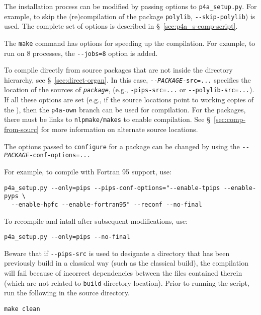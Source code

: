\documentclass[a4paper]{article}
\begin{document}
The installation process can be modified by passing options to
\verb|p4a_setup.py|. For example, to skip the (re)compilation of the
package \texttt{polylib},
\verb/--skip-polylib/) is used. The complete set of options is described in
\S~\ref{sec:p4a_s-comp-script}.

The \texttt{make} command has options for speeding up the compilation. For
example, to run on 8 processes, the \verb/--jobs=8/ option is added.

To compile \Apfa directly from source packages that are not
inside the \Apfa directory hierarchy, see \S~\ref{sec:direct-organ}. In
this case, \texttt{-{}-\emph{PACKAGE}-src=...} specifies the
location of the sources of \texttt{\emph{package}}, (e.g.,
\verb|-pips-src=...| or \verb|--polylib-src=...|). If all these options are
set (e.g., if the source locations point to working copies of the
\Apips{} \Asvn), then the \texttt{p4a-own} branch can be used for
compilation. For the \Apips
packages, there must be links to \texttt{nlpmake/makes} to enable compilation.
See \S~\ref{sec:comp-from-sourc} for more information on alternate
source locations.

The options passed to \texttt{configure} for a package can be changed by
using the \texttt{-{}-\emph{PACKAGE}-conf-options=...}

For example, to compile \Apips with Fortran 95 support, use:
\begin{verbatim}
p4a_setup.py --only=pips --pips-conf-options="--enable-tpips --enable-pyps \
  --enable-hpfc --enable-fortran95" --reconf --no-final
\end{verbatim}

To recompile and intall \Apips after subsequent modifications, use:
\begin{verbatim}
p4a_setup.py --only=pips --no-final
\end{verbatim}

Beware that if \verb|--pips-src| is used to designate a \Apips
directory that has been previously build in a classical way (such as
the classical \Asvn build), the compilation will fail because of
incorrect dependencies between the files contained therein (which are not
related to \Apfa \texttt{build} directory location). Prior to running
the script, run the following in the \Apips source directory.
\begin{verbatim}
make clean
\end{verbatim}
\end{document}
